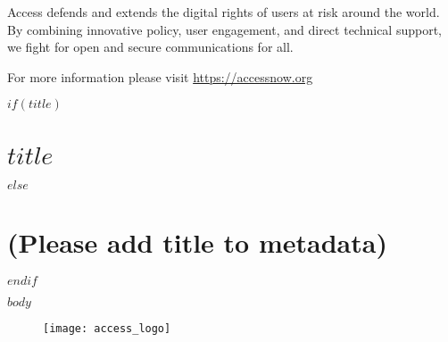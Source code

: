 \documentclass[11pt,fleqn]{book} %
\begin{document}
Access defends and extends the digital rights of users at risk around the world. By combining innovative policy, user engagement, and direct technical support, we fight for open and secure communications for all.

For more information please visit \url{https://accessnow.org}



$if(title)$
\chapter{$title$}
$else$
\chapter{(Please add title to metadata)}
$endif$

$body$







\newpage
\vfill
\thispagestyle{empty}

\begin{figure}
  \centering
    \texttt{[image: access\_logo]}
\end{figure}


\vfill
\end{document}
